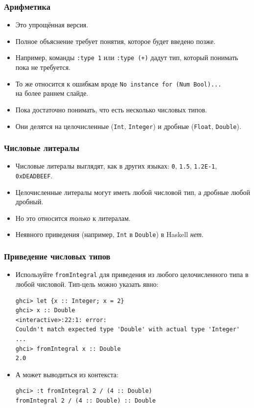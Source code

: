 \documentclass[10pt]{beamer}
\begin{document}
\begin{frame}[fragile]
  \frametitle{Арифметика}
  \begin{itemize}
    \item Это упрощённая версия.
    \item Полное объяснение требует понятия, которое будет введено позже.
    \item Например, команды \lstinline|:type 1| или \lstinline|:type (+)| дадут тип, который понимать пока не требуется.
    \item То же относится к ошибкам вроде \lstinline[breaklines=false]|No instance for (Num Bool)...|\\ на более раннем слайде.
    \item Пока достаточно понимать, что есть несколько числовых типов.
    \item Они делятся на целочисленные (\lstinline|Int|, \lstinline|Integer|) и дробные (\lstinline|Float|, \lstinline|Double|).
  \end{itemize}
\end{frame}

\begin{frame}[fragile]
  \frametitle{Числовые литералы}
  \begin{itemize}
    \item Числовые литералы выглядят, как в других языках: \lstinline|0|, \lstinline|1.5|, \lstinline|1.2E-1|, \lstinline|0xDEADBEEF|.
    \item Целочисленные литералы могут иметь любой числовой тип, а дробные любой дробный.
    \item Но это относится \emph{только} к литералам.
    \item Неявного приведения (например, \lstinline|Int| в \lstinline|Double|) в Haskell \emph{нет}.
  \end{itemize}
\end{frame}

\begin{frame}[fragile]
  \frametitle{Приведение числовых типов}
  \begin{itemize}
    \item Используйте \lstinline|fromIntegral| для приведения из любого целочисленного типа в любой числовой. Тип-цель можно указать явно:
          \begin{lstlisting}
ghci> let {x :: Integer; x = 2}
ghci> x :: Double
<interactive>:22:1: error:
Couldn't match expected type 'Double' with actual type 'Integer' ...
ghci> fromIntegral x :: Double
2.0
\end{lstlisting}
    \item А может выводиться из контекста:
          \begin{lstlisting}
ghci> :t fromIntegral 2 / (4 :: Double)
fromIntegral 2 / (4 :: Double) :: Double
\end{lstlisting}
  \end{itemize}
\end{frame}
\end{document}

